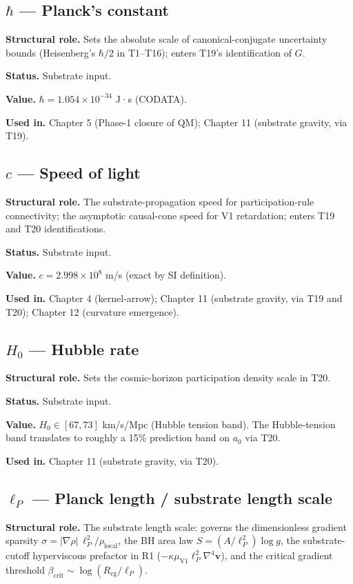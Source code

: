 \documentclass[11pt]{book}
\begin{document}
\subsection{$\hbar$ — Planck's constant}

\textbf{Structural role.} Sets the absolute scale of canonical-conjugate uncertainty bounds (Heisenberg's $\hbar/2$ in T1–T16); enters T19's identification of $G$.

\textbf{Status.} Substrate input.

\textbf{Value.} $\hbar = 1.054 \times 10^{-34}$ J·s (CODATA).

\textbf{Used in.} Chapter 5 (Phase-1 closure of QM); Chapter 11 (substrate gravity, via T19).

\subsection{$c$ — Speed of light}

\textbf{Structural role.} The substrate-propagation speed for participation-rule connectivity; the asymptotic causal-cone speed for V1 retardation; enters T19 and T20 identifications.

\textbf{Status.} Substrate input.

\textbf{Value.} $c = 2.998 \times 10^8$ m/s (exact by SI definition).

\textbf{Used in.} Chapter 4 (kernel-arrow); Chapter 11 (substrate gravity, via T19 and T20); Chapter 12 (curvature emergence).

\subsection{$H_0$ — Hubble rate}

\textbf{Structural role.} Sets the cosmic-horizon participation density scale in T20.

\textbf{Status.} Substrate input.

\textbf{Value.} $H_0 \in [67, 73]$ km/s/Mpc (Hubble tension band). The Hubble-tension band translates to roughly a 15\% prediction band on $a_0$ via T20.

\textbf{Used in.} Chapter 11 (substrate gravity, via T20).

\subsection{$\ell_P$ — Planck length / substrate length scale}

\textbf{Structural role.} The substrate length scale: governs the dimensionless gradient sparsity $\sigma = |\nabla\rho|\,\ell_P^2/\rho_\mathrm{local}$, the BH area law $S = (A/\ell_P^2)\log g$, the substrate-cutoff hyperviscous prefactor in R1 ($-\kappa\mu_\mathrm{V1}\ell_P^2\nabla^4\mathbf{v}$), and the critical gradient threshold $\beta_\mathrm{crit}\sim\log(R_\mathrm{cg}/\ell_P)$.
\end{document}

